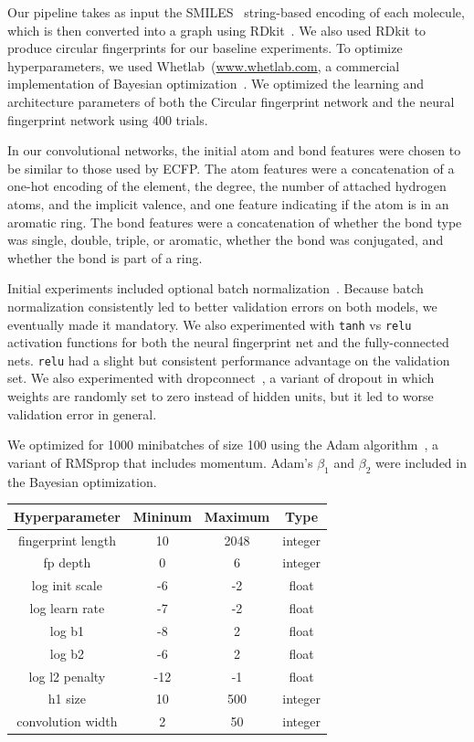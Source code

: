 \documentclass{article}
\begin{document}
Our pipeline takes as input the SMILES~\citep{weininger1988smiles} string-based encoding of each molecule, which is then converted into a graph using RDkit~\citep{rdkit}.
We also used RDkit to produce circular fingerprints for our baseline experiments.
To optimize hyperparameters, we used Whetlab~(\url{www.whetlab.com}, a commercial implementation of Bayesian optimization~\citep{snoek2012practical}.
We optimized the learning and architecture parameters of both the Circular fingerprint network and the neural fingerprint network using 400 trials.

In our convolutional networks, the initial atom and bond features were chosen to be similar to those used by ECFP.
The atom features were a concatenation of a one-hot encoding of the element, the degree, the number of attached hydrogen atoms, and the implicit valence, and one feature indicating if the atom is in an aromatic ring. 
The bond features were a concatenation of whether the bond type was single, double, triple, or aromatic, whether the bond was conjugated, and whether the bond is part of a ring.

Initial experiments included optional batch normalization~\citep{ioffe2015batch}.
Because batch normalization consistently led to better validation errors on both models, we eventually made it mandatory.
We also experimented with \texttt{tanh} vs \texttt{relu} activation functions for both the neural fingerprint net and the fully-connected nets.  \texttt{relu} had a slight but consistent performance advantage on the validation set.
We also experimented with dropconnect~\citep{wan2013regularization}, a variant of dropout in which weights are randomly set to zero instead of hidden units, but it led to worse validation error in general.

We optimized for 1000 minibatches of size 100 using the Adam algorithm~\citep{Adam14}, a variant of RMSprop that includes momentum.
Adam's $\beta_1$ and $\beta_2$ were included in the Bayesian optimization.

\begin{table}
\center
\begin{tabular}{c|ccc}
Hyperparameter & Mininum & Maximum & Type \\
\hline
fingerprint length & 10   &   2048  & integer \\
fp depth  & 0 &       6 &     integer \\
log init scale & -6 &      -2 &     float \\
log learn rate & -7 &      -2 &    float \\
log b1 & -8 &      2 &    float \\
log b2 & -6 &     2 &   float \\
log l2 penalty & -12 &     -1 &   float \\
h1 size & 10   &   500  & integer \\
\hline 
convolution width & 2 & 50 & integer
\end{tabular}
\end{table}
\end{document}

